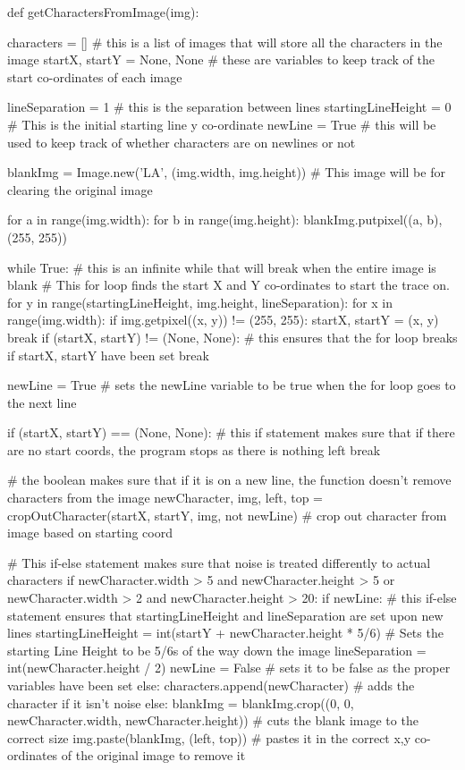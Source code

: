 \documentclass{report}
\begin{document}
\begin{python}
def getCharactersFromImage(img):

    characters = []  # this is a list of images that will store all the characters in the image
    startX, startY = None, None  # these are variables to keep track of the start co-ordinates of each image

    lineSeparation = 1  # this is the separation between lines
    startingLineHeight = 0  # This is the initial starting line y co-ordinate
    newLine = True  # this will be used to keep track of whether characters are on newlines or not

    blankImg = Image.new('LA', (img.width, img.height))  # This image will be for clearing the original image

    for a in range(img.width):
        for b in range(img.height):
            blankImg.putpixel((a, b), (255, 255))

    while True:  # this is an infinite while that will break when the entire image is blank
        #  This for loop finds the start X and Y co-ordinates to start the trace on.
        for y in range(startingLineHeight, img.height, lineSeparation):
            for x in range(img.width):
                if img.getpixel((x, y)) != (255, 255):
                    startX, startY = (x, y)
                    break
            if (startX, startY) != (None, None):  # this ensures that the for loop breaks if startX, startY have been set
                break

            newLine = True  # sets the newLine variable to be true when the for loop goes to the next line

        if (startX, startY) == (None, None):  # this if statement makes sure that if there are no start coords, the program stops as there is nothing left
            break

        # the boolean makes sure that if it is on a new line, the function doesn't remove characters from the image
        newCharacter, img, left, top = cropOutCharacter(startX, startY, img, not newLine)  # crop out character from image based on starting coord

        #  This if-else statement makes sure that noise is treated differently to actual characters
        if newCharacter.width > 5 and newCharacter.height > 5 or newCharacter.width > 2 and newCharacter.height > 20:
            if newLine:  # this if-else statement ensures that startingLineHeight and lineSeparation are set upon new lines
                startingLineHeight = int(startY + newCharacter.height * 5/6)  # Sets the starting Line Height to be 5/6s of the way down the image
                lineSeparation = int(newCharacter.height / 2)
                newLine = False  # sets it to be false as the proper variables have been set
            else:
                characters.append(newCharacter)  # adds the character if it isn't noise
        else:
            blankImg = blankImg.crop((0, 0, newCharacter.width, newCharacter.height))  # cuts the blank image to the correct size
            img.paste(blankImg, (left, top))  # pastes it in the correct x,y co-ordinates of the original image to remove it


\end{python}
\end{document}
